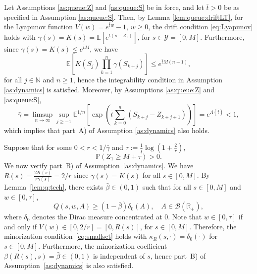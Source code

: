 \documentclass[a4paper,10pt]{article}
\newcommand{\N}{\mathbb{N}}
\newcommand{\Y}{\mathcal{Y}}
\renewcommand{\P}{\mathbb{P}}
\newcommand{\E}{\mathbb{E}}
\begin{document}
Let Assumptions \ref{as:queue:Z} and \ref{as:queue:S} be in force, and let $\bar{t} > 0$ be as specified in Assumption \ref{as:queue:S}. Then, by Lemma \ref{lem:queue:driftLT}, for the Lyapunov function $V(w) = e^{\bar{t}w} - 1$, $w \ge 0$, the drift condition \eqref{eq:Lyapunov} holds with $\gamma(s) = K(s) = \E [e^{\bar{t}(s - Z_1)}]$, for $s \in \Y = [0, M]$. Furthermore, since $\gamma(s) = K(s) \le e^{\bar{t}M}$, we have
\[
\E \left[ K(S_j) \prod_{k=1}^n \gamma(S_{k+j}) \right] \le e^{\bar{t}M(n+1)},
\]
for all $j \in \N$ and $n \ge 1$, hence the integrability condition in Assumption \ref{as:dynamics} is satisfied. Moreover, by Assumptions \ref{as:queue:Z} and \ref{as:queue:S},
\[
\bar{\gamma} = \limsup_{n \to \infty} \sup_{j \ge -1} \E^{1/n} \left[
\exp\left( \bar{t} \sum_{k=0}^n (S_{k+j} - Z_{k+j+1}) \right)
\right] = e^{\Lambda(\bar{t})} < 1,
\]
which implies that part~A) of Assumption \ref{as:dynamics} also holds.

Suppose that for some $0 < r < 1/\bar{\gamma}$ and $\tau := \frac{1}{\bar{t}} \log\left(1 + \frac{2}{r}\right)$,
\[
\P\left(Z_1 \ge M + \tau\right) > 0.
\]
We now verify part~B) of Assumption~\ref{as:dynamics}. We have $R(s) = \frac{2K(s)}{r\gamma(s)} = 2/r$ since $\gamma(s) = K(s)$ for all $s \in [0, M]$. By Lemma~\ref{lem:q:tech}, there exists $\bar{\beta} \in (0, 1)$ such that for all $s \in [0, M]$ and $w \in [0, \tau]$,
\[
Q(s, w, A) \ge (1 - \bar{\beta}) \delta_0(A), \quad A \in \mathcal{B}(\mathbb{R}_+),
\]
where $\delta_0$ denotes the Dirac measure concentrated at $0$. Note that $w \in [0, \tau]$ if and only if $V(w) \in [0, 2/r] = [0, R(s)]$, for $s \in [0, M]$. Therefore, the minorization condition~\eqref{eq:smallset} holds with $\kappa_R(s, \cdot) = \delta_0(\cdot)$ for $s \in [0, M]$. Furthermore, the minorization coefficient $\beta(R(s), s) = \bar{\beta} \in (0, 1)$ is independent of $s$, hence part~B) of Assumption~\ref{as:dynamics} is also satisfied.
\end{document}
